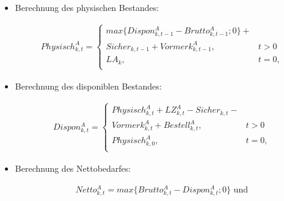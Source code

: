 \documentclass[13pt,a4paper, listof=entryprefix, bibliography=totocnumbered,toc=listofnumbered,lof=listofnumbered]{scrartcl}
\begin{document}
\begin{algorithmic}
\begin{itemize} [leftmargin=*]
\begin{enumerate} [leftmargin=1.5em, label=]
\begin{enumerate} [leftmargin=*, label= \arabic*.]
\begin{itemize} [leftmargin=*]
					                  \item Berechnung des physischen Bestandes:
					                        \begin{fleqn}[0cm]
						                        \begin{align*}
							                        Physisch^{A}_{k,t} = \begin{cases}	 max\{Dispon^{A}_{k,t-1} -Brutto^{A}_{k,t-1}; 0\} + \\
								                                             Sicher_{k,t-1} + Vormerk^{A}_{k,t-1},
								                                                     & t > 0                                    \\
								                                             LA_{k}, & t = 0\text{,}                            \\
							                                             \end{cases}
						                        \end{align*}
					                        \end{fleqn}

					                  \item Berechnung des disponiblen Bestandes:

					                        \begin{fleqn}
						                        \begin{align*}
							                        Dispon^{A}_{k,t} = \begin{cases}	 Physisch^{A}_{k,t} + LZ^{A}_{k,t} - Sicher_{k,t} - \\
								                                           Vormerk^{A}_{k,t} + Bestell^{A}_{k,t},
								                                                               & t > 0                        \\
								                                           Physisch^{A}_{k,0}, & t = 0\text{,}                \\
							                                           \end{cases}
						                        \end{align*}
					                        \end{fleqn}

					                  \item Berechnung des Nettobedarfes:

					                        \begin{fleqn}
						                        \begin{align*}
							                        Netto^{A}_{k,t} = max \{Brutto^{A}_{k,t} - Dispon^{A}_{k,t}; 0 \}\text{ und}
						                        \end{align*}
					                        \end{fleqn}


\end{itemize}
\end{enumerate}
\end{enumerate}
\end{itemize}
\end{algorithmic}
\end{document}
